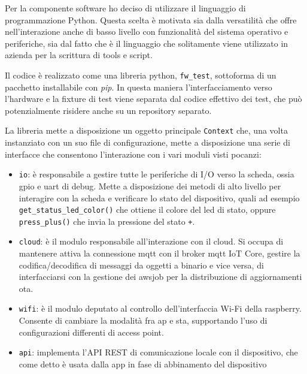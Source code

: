 \documentclass[12pt,a4paper,twoside,titlepage]{book}
\begin{document}
Per la componente software ho deciso di utilizzare il linguaggio di programmazione
Python. Questa scelta è motivata sia dalla versatilità che offre nell'interazione anche
di basso livello con funzionalità del sistema operativo e periferiche, sia dal fatto
che è il linguaggio che solitamente viene utilizzato in azienda per la scrittura di
tools e script.

Il codice è realizzato come una libreria python, \texttt{fw\_test}, sottoforma di
un pacchetto installabile con \textit{pip}. In questa maniera l'interfacciamento
verso l'hardware e la fixture di test viene separata dal codice effettivo dei test,
che può potenzialmente risidere anche su un repository separato.

La libreria mette a disposizione un oggetto principale \texttt{Context} che, una
volta instanziato con un suo file di configurazione, mette a disposizione una serie
di interfacce che consentono l'interazione con i vari moduli visti pocanzi:

\begin{itemize}
    \item \texttt{io}: è responsabile a gestire tutte le periferiche di I/O
        verso la scheda, ossia \Gls{gpio} e \Gls{uart} di debug. Mette a disposizione dei metodi di
        alto livello per interagire con la scheda e verificare lo stato del dispositivo,
        quali ad esempio \texttt{get\_status\_led\_color()} che ottiene il colore del
        \acrshort{led} di stato, oppure \texttt{press\_plus()} che invia la pressione del stato \texttt{+}.
    \item \texttt{cloud}: è il modulo responsabile all'interazione con il cloud. Si
        occupa di mantenere attiva la connessione \Gls{mqtt} con il broker \Gls{mqtt} IoT Core,
        gestire la codifica/decodifica di messaggi da oggetti a binario e vice versa,
        di interfacciarsi con la gestione dei \Gls{awsjob} per la distribuzione di aggiornamenti
        \acrshort{ota}.
    \item \texttt{wifi}: è il modulo deputato al controllo dell'interfaccia Wi-Fi
        della raspberry. Consente di cambiare la modalità fra \acrshort{ap} e \acrshort{sta},
        supportando l'uso di configurazioni differenti di access point.
    \item \texttt{api}: implementa l'API REST di comunicazione locale con il dispositivo,
        che come detto è usata dalla app in fase di abbinamento del dispositivo
\end{itemize}
\end{document}

